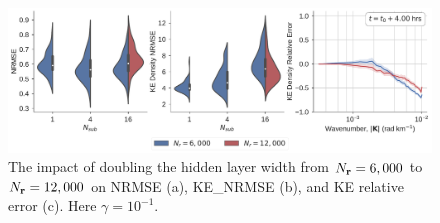 \begin{figure}
    \centering
    \includegraphics[width=\textwidth]{../figures/rc_reservoir_size.pdf}
    \caption{The impact of doubling the hidden layer width from $N_{\mathbf{r}}=6,000$ to
        $N_{\mathbf{r}}=12,000$ on NRMSE (a), KE\_NRMSE (b), and KE relative error (c).
        Here $\gamma=10^{-1}$.
    }
    \label{fig:esn-size}
\end{figure}
